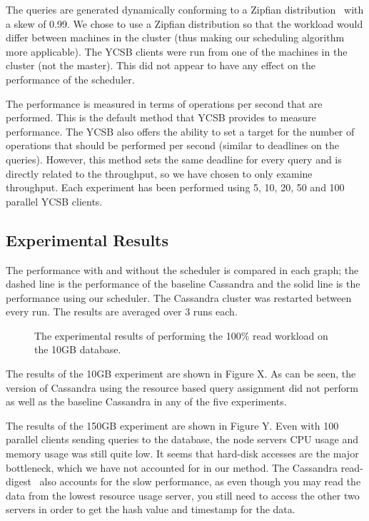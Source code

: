 \documentclass[]{acm_proc_article-sp}
\begin{document}
The queries are generated dynamically conforming to a Zipfian distribution~\cite{Quckly Generating Billion-Record Synthetic Databases} with a skew of 0.99. We chose to use a Zipfian distribution so that the workload would differ between machines in the cluster (thus making our scheduling algorithm more applicable). The YCSB clients were run from one of the machines in the cluster (not the master). This did not appear to have any effect on the performance of the scheduler. 

The performance is measured in terms of operations per second that are performed. This is the default method that YCSB provides to measure performance. The YCSB also offers the ability to set a target for the number of operations that should be performed per second (similar to deadlines on the queries). However, this method sets the same deadline for every query and is directly related to the throughput, so we have chosen to only examine throughput. Each experiment has been performed using 5, 10, 20, 50 and 100 parallel YCSB clients.

\subsection{Experimental Results}
The performance with and without the scheduler is compared in each graph; the dashed line is the performance of the baseline Cassandra and the solid line is the performance using our scheduler. The Cassandra cluster was restarted between every run. The results are averaged over 3 runs each.

\begin{figure*}[t]

\caption{The experimental results of performing the 100\% read workload on the 10GB database.}
\label{fig:10g_reads}
\end{figure*}

The results of the 10GB experiment are shown in Figure X. As can be seen, the version of Cassandra using the resource based query assignment did not perform as well as the baseline Cassandra in any of the five experiments.

The results of the 150GB experiment are shown in Figure Y. Even with 100 parallel clients sending queries to the database, the node servers CPU usage and memory usage was still quite low. It seems that hard-disk accesses are the major bottleneck, which we have not accounted for in our method. The Cassandra read-digest~\cite{http://wiki.apache.org/cassandra/DigestQueries} also accounts for the slow performance, as even though you may read the data from the lowest resource usage server, you still need to access the other two servers in order to get the hash value and timestamp for the data.
\end{document}
